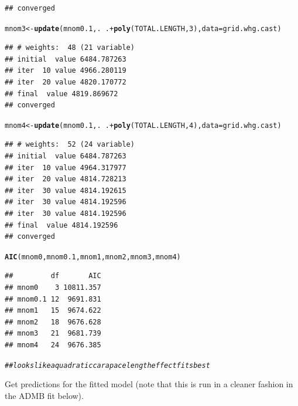 \documentclass[12pt]{article}\usepackage[]{graphicx}\usepackage[]{color}
\makeatletter
\newcommand{\hlnum}[1]{\textcolor[rgb]{0.686,0.059,0.569}{#1}}%
\newcommand{\hlcom}[1]{\textcolor[rgb]{0.678,0.584,0.686}{\textit{#1}}}%
\newcommand{\hlopt}[1]{\textcolor[rgb]{0,0,0}{#1}}%
\newcommand{\hlstd}[1]{\textcolor[rgb]{0.345,0.345,0.345}{#1}}%
\newcommand{\hlkwb}[1]{\textcolor[rgb]{0.69,0.353,0.396}{#1}}%
\newcommand{\hlkwc}[1]{\textcolor[rgb]{0.333,0.667,0.333}{#1}}%
\newcommand{\hlkwd}[1]{\textcolor[rgb]{0.737,0.353,0.396}{\textbf{#1}}}%
\newenvironment{kframe}{%
 \def\at@end@of@kframe{}%
 \ifinner\ifhmode%
  \def\at@end@of@kframe{\end{minipage}}%
  \begin{minipage}{\columnwidth}%
 \fi\fi%
 \def\FrameCommand##1{\hskip\@totalleftmargin \hskip-\fboxsep
 \colorbox{shadecolor}{##1}\hskip-\fboxsep
     \hskip-\linewidth \hskip-\@totalleftmargin \hskip\columnwidth}%
 \MakeFramed {\advance\hsize-\width
   \@totalleftmargin\z@ \linewidth\hsize
   \@setminipage}}%
 {\par\unskip\endMakeFramed%
 \at@end@of@kframe}
\newenvironment{knitrout}{}{} %
\makeatother
\begin{document}
\begin{knitrout}
\begin{kframe}
\begin{verbatim}
## converged
\end{verbatim}
\begin{alltt}
\hlstd{mnom3} \hlkwb{<-} \hlkwd{update}\hlstd{(mnom0.1, .} \hlopt{~} \hlstd{.} \hlopt{+} \hlkwd{poly}\hlstd{(TOTAL.LENGTH,} \hlnum{3}\hlstd{),} \hlkwc{data} \hlstd{= grid.whg.cast)}
\end{alltt}
\begin{verbatim}
## # weights:  48 (21 variable)
## initial  value 6484.787263 
## iter  10 value 4966.280119
## iter  20 value 4820.170772
## final  value 4819.869672 
## converged
\end{verbatim}
\begin{alltt}
\hlstd{mnom4} \hlkwb{<-} \hlkwd{update}\hlstd{(mnom0.1, .} \hlopt{~} \hlstd{.} \hlopt{+} \hlkwd{poly}\hlstd{(TOTAL.LENGTH,} \hlnum{4}\hlstd{),} \hlkwc{data} \hlstd{= grid.whg.cast)}
\end{alltt}
\begin{verbatim}
## # weights:  52 (24 variable)
## initial  value 6484.787263 
## iter  10 value 4964.317977
## iter  20 value 4814.728213
## iter  30 value 4814.192615
## iter  30 value 4814.192596
## iter  30 value 4814.192596
## final  value 4814.192596 
## converged
\end{verbatim}
\begin{alltt}
\hlkwd{AIC}\hlstd{(mnom0, mnom0.1, mnom1, mnom2, mnom3, mnom4)}
\end{alltt}
\begin{verbatim}
##         df       AIC
## mnom0    3 10811.357
## mnom0.1 12  9691.831
## mnom1   15  9674.622
## mnom2   18  9676.628
## mnom3   21  9681.739
## mnom4   24  9676.385
\end{verbatim}
\begin{alltt}
\hlcom{## looks like a quadratic carapace length effect fits best}
\end{alltt}
\end{kframe}
\end{knitrout}


Get predictions for the fitted model (note that this is run in a cleaner fashion in the ADMB fit below).
\end{document}
